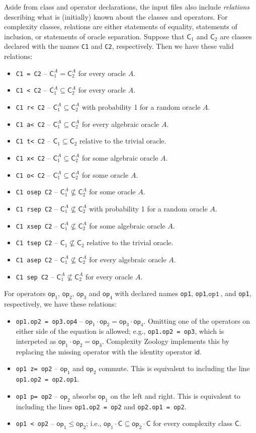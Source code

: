 \documentclass[12pt]{amsart}
\theoremstyle{definition}
\theoremstyle{remark}
\newcommand{\sC}{\mathsf{C}}
\newcommand{\msf}[1]{\mathsf{#1}}
\newcommand{\id}{\msf{id}}
\newcommand{\op}{\msf{op}}
\begin{document}
Aside from class and operator declarations, the input files also include
\textit{relations} describing what is (initially) known about the classes and
operators. For complexity classes, relations are either statements of equality,
statements of inclusion, or statements of oracle separation. Suppose that
$\sC_1$ and $\sC_2$ are classes declared with the names \texttt{C1} and
\texttt{C2}, respectively. Then we have these valid relations:
\begin{itemize}
\item \texttt{C1 = C2} -- $\sC_1^A=\sC_2^A$ for every oracle $A$.
\item \texttt{C1 < C2} -- $\sC_1^A\subseteq\sC_2^A$ for every oracle $A$.
\item \texttt{C1 r< C2} -- $\sC_1^A\subseteq\sC_2^A$ with probability 1 for a
  random oracle $A$.
\item \texttt{C1 a< C2} -- $\sC_1^A\subseteq\sC_2^A$ for every algebraic oracle
  $A$.
\item \texttt{C1 t< C2} -- $\sC_1\subseteq\sC_2$ relative to the trivial oracle.
\item \texttt{C1 x< C2} -- $\sC_1^A\subseteq\sC_2^A$ for some algebraic oracle
  $A$.
\item \texttt{C1 o< C2} -- $\sC_1^A\subseteq\sC_2^A$ for some oracle $A$.
\item \texttt{C1 osep C2} -- $\sC_1^A\not\subseteq\sC_2^A$ for some oracle $A$.
\item \texttt{C1 rsep C2} -- $\sC_1^A\not\subseteq\sC_2^A$ with probability 1
  for a random oracle $A$.
\item \texttt{C1 xsep C2} -- $\sC_1^A\not\subseteq\sC_2^A$ for some algebraic
  oracle $A$.
\item \texttt{C1 tsep C2} -- $\sC_1\not\subseteq\sC_2$ relative to the trivial
  oracle.
\item \texttt{C1 asep C2} -- $\sC_1^A\not\subseteq\sC_2^A$ for every algebraic
  oracle $A$.
\item \texttt{C1 sep C2} -- $\sC_1^A\not\subseteq\sC_2^A$ for every oracle $A$.
\end{itemize}
For operators $\op_1$, $\op_2$, $\op_3$ and $\op_4$ with declared names
\texttt{op1}, \texttt{op1}$, \texttt{op1}$, and \texttt{op1},
respectively, we have these relations:
\begin{itemize}
\item \texttt{op1.op2 = op3.op4} -- $\op_1\cdot\op_2=\op_3\cdot\op_4$. Omitting
  one of the operators on either side of the equation is allowed; e.g.,
  \texttt{op1.op2 = op3}, which is interpeted as $\op_1\cdot\op_2=\op_3$.
  Complexity Zoology implements this by replacing the missing operator with the
  identity operator $\id$.
\item \texttt{op1 z= op2} -- $\op_1$ and $\op_2$ commute. This is equivalent to
  including the line \texttt{op1.op2 = op2.op1}.
\item \texttt{op1 p= op2} -- $\op_2$ absorbs $\op_1$ on the left and right. This
  is equivalent to including the lines \texttt{op1.op2 = op2} and
  \texttt{op2.op1 = op2}.
\item \texttt{op1 < op2} -- $\op_1\leq\op_2$; i.e.,
  $\op_1\cdot\sC\subseteq\op_2\cdot\sC$ for every complexity class $\sC$.
\end{itemize}
\end{document}
